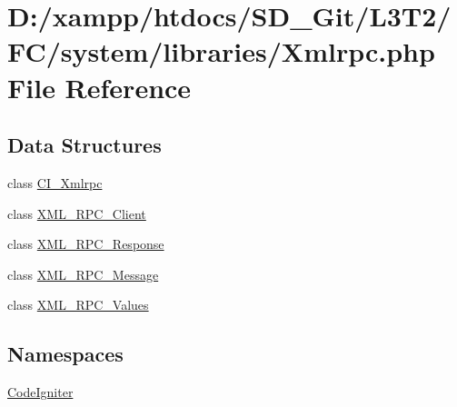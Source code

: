 \hypertarget{system_2libraries_2_xmlrpc_8php}{}\section{D\+:/xampp/htdocs/\+S\+D\+\_\+\+Git/\+L3\+T2/\+F\+C/system/libraries/\+Xmlrpc.php File Reference}
\label{system_2libraries_2_xmlrpc_8php}
\subsection*{Data Structures}
\begin{DoxyCompactItemize}
\item 
class \hyperlink{class_c_i___xmlrpc}{C\+I\+\_\+\+Xmlrpc}
\item 
class \hyperlink{class_x_m_l___r_p_c___client}{X\+M\+L\+\_\+\+R\+P\+C\+\_\+\+Client}
\item 
class \hyperlink{class_x_m_l___r_p_c___response}{X\+M\+L\+\_\+\+R\+P\+C\+\_\+\+Response}
\item 
class \hyperlink{class_x_m_l___r_p_c___message}{X\+M\+L\+\_\+\+R\+P\+C\+\_\+\+Message}
\item 
class \hyperlink{class_x_m_l___r_p_c___values}{X\+M\+L\+\_\+\+R\+P\+C\+\_\+\+Values}
\end{DoxyCompactItemize}
\subsection*{Namespaces}
\begin{DoxyCompactItemize}
\item 
 \hyperlink{namespace_code_igniter}{Code\+Igniter}
\end{DoxyCompactItemize}
